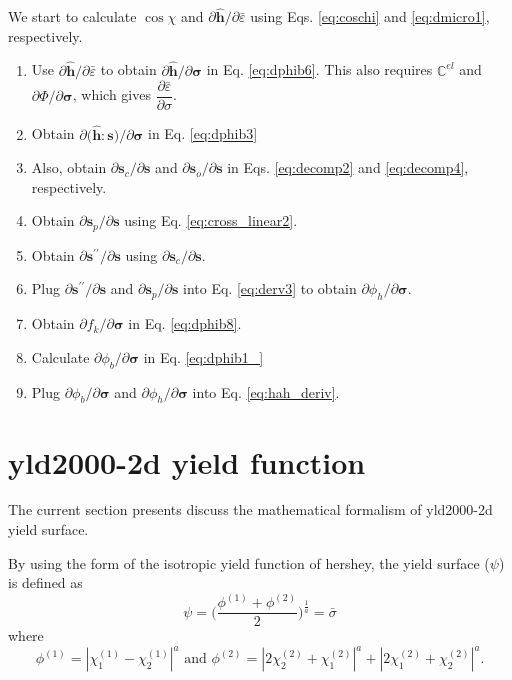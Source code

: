 \documentclass[12pt]{amsart}
\begin{document}
We start to calculate $\cos\chi$ and $\partial \hat{\mathbf{h}}/\partial \bar{\varepsilon}$ using Eqs. \ref{eq:coschi} and \ref{eq:dmicro1}, respectively.
\begin{enumerate}
\item Use $\partial \hat{\mathbf{h}}/\partial \bar{\varepsilon}$ to obtain $\partial \hat{\mathbf{h}}/\partial \mathbf{\sigma}$ in Eq. \ref{eq:dphib6}. This also requires $\mathbb{C}^{el}$ and $\partial\Phi/\partial\mathbf{\sigma}$, which gives $\dfrac{\partial\bar{\varepsilon}}{\partial\sigma}$.
\item Obtain $\partial\big(\hat{\mathbf{h}}:\mathbf{s}\big)/\partial \mathbf{\sigma}$ in Eq. \ref{eq:dphib3}
\item Also, obtain $\partial \mathbf{s}_c/\partial \mathbf{s}$ and $\partial \mathbf{s}_o/\partial\mathbf{s}$ in Eqs. \ref{eq:decomp2} and \ref{eq:decomp4}, respectively.
\item Obtain $\partial \mathbf{s}_p/\partial\mathbf{s}$ using Eq. \ref{eq:cross_linear2}.
\item Obtain $\partial\mathbf{s}^{\prime\prime}/\partial\mathbf{s}$ using $\partial \mathbf{s}_c/\partial \mathbf{s}$.
\item Plug $\partial\mathbf{s}^{\prime\prime}/\partial\mathbf{s}$ and  $\partial \mathbf{s}_p/\partial\mathbf{s}$ into Eq. \ref{eq:derv3} to obtain $\partial\phi_h/\partial\mathbf{\sigma}$.
\item Obtain $\partial f_k/\partial \mathbf{\sigma}$ in Eq. \ref{eq:dphib8}.
\item Calculate $\partial \phi_b/\partial \mathbf{\sigma}$ in Eq. \ref{eq:dphib1_}
\item Plug $\partial \phi_b/\partial\mathbf{\sigma}$ and $\partial\phi_h/\partial\mathbf{\sigma}$ into Eq. \ref{eq:hah_deriv}.
\end{enumerate}
\newpage
\section{yld2000-2d yield function}
The current section presents discuss the mathematical formalism of yld2000-2d yield surface.

By using the form of the isotropic yield function of hershey, the yield surface ($\psi$) is defined as
\begin{equation}
  \label{eq:hershey}
  \psi=\bigg(\frac{\phi^{(1)} + \phi^{(2)}}{2}\bigg)^{\frac{1}{a}}=\bar{\sigma}
\end{equation}
where
\begin{equation}
  \label{eq:hershey2}
  \phi^{(1)} = |\chi^{(1)}_1-\chi^{(1)}_2|^a \text{ and } \phi^{(2)}=|2\chi^{(2)}_2+\chi^{(2)}_1|^a+|2\chi^{(2)}_1+\chi^{(2)}_2|^a.
\end{equation}
\end{document}
